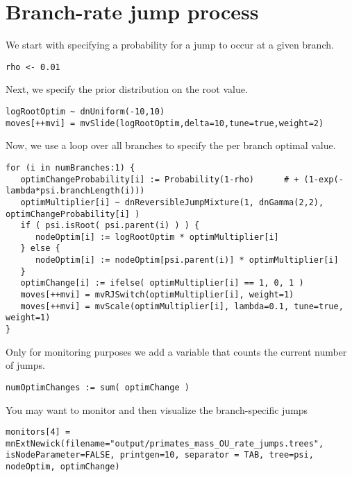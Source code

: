 \vspace{5cm}



\section{Branch-rate jump process}


We start with specifying a probability for a jump to occur at a given branch.
{\tt \small \begin{snugshade*}
\begin{lstlisting}
rho <- 0.01
\end{lstlisting}
\end{snugshade*}}

Next, we specify the prior distribution on the root value.
{\tt \small \begin{snugshade*}
\begin{lstlisting}
logRootOptim ~ dnUniform(-10,10)
moves[++mvi] = mvSlide(logRootOptim,delta=10,tune=true,weight=2)
\end{lstlisting}
\end{snugshade*}}

Now, we use a loop over all branches to specify the per branch optimal value.
{\tt \small \begin{snugshade*}
\begin{lstlisting}
for (i in numBranches:1) {
   optimChangeProbability[i] := Probability(1-rho)      # + (1-exp(-lambda*psi.branchLength(i)))
   optimMultiplier[i] ~ dnReversibleJumpMixture(1, dnGamma(2,2), optimChangeProbability[i] )
   if ( psi.isRoot( psi.parent(i) ) ) {
      nodeOptim[i] := logRootOptim * optimMultiplier[i]
   } else {
      nodeOptim[i] := nodeOptim[psi.parent(i)] * optimMultiplier[i]
   }
   optimChange[i] := ifelse( optimMultiplier[i] == 1, 0, 1 )
   moves[++mvi] = mvRJSwitch(optimMultiplier[i], weight=1)
   moves[++mvi] = mvScale(optimMultiplier[i], lambda=0.1, tune=true, weight=1)
}
\end{lstlisting}
\end{snugshade*}}
Only for monitoring purposes we add a variable that counts the current number of jumps.
{\tt \small \begin{snugshade*}
\begin{lstlisting}
numOptimChanges := sum( optimChange )
\end{lstlisting}
\end{snugshade*}}
You may want to monitor and then visualize the branch-specific jumps
{\tt \small \begin{snugshade*}
\begin{lstlisting}
monitors[4] = mnExtNewick(filename="output/primates_mass_OU_rate_jumps.trees", isNodeParameter=FALSE, printgen=10, separator = TAB, tree=psi, nodeOptim, optimChange)
\end{lstlisting}
\end{snugshade*}}






